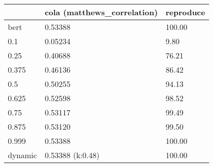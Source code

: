 \begin{tabular}{lll}
\toprule
{} & cola (matthews\_correlation) & reproduce \\
\midrule
bert    &                     0.53388 &    100.00 \\
0.1     &                     0.05234 &      9.80 \\
0.25    &                     0.40688 &     76.21 \\
0.375   &                     0.46136 &     86.42 \\
0.5     &                     0.50255 &     94.13 \\
0.625   &                     0.52598 &     98.52 \\
0.75    &                     0.53117 &     99.49 \\
0.875   &                     0.53120 &     99.50 \\
0.999   &                     0.53388 &    100.00 \\
dynamic &            0.53388 (k:0.48) &    100.00 \\
\bottomrule
\end{tabular}
